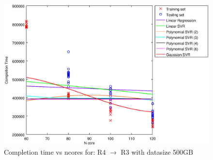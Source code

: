 
\begin {figure}[hbtp]
\centering
\includegraphics[width=\textwidth]{output/R4_R3_500_ALL_FEATURES/plot_R4_R3_500.eps}
\caption{Completion time vs ncores for: R4 $\rightarrow$ R3 with datasize 500GB}
\label{fig:coreonly_linear_R4_R3_500}
\end {figure}
